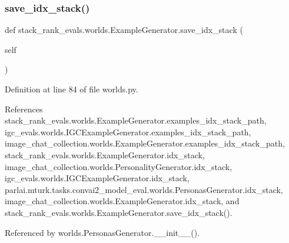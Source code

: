 \subsubsection{\texorpdfstring{save\+\_\+idx\+\_\+stack()}{save\_idx\_stack()}\hspace{0.1cm}{\footnotesize\ttfamily [2/2]}}
{\footnotesize\ttfamily def stack\+\_\+rank\+\_\+evals.\+worlds.\+Example\+Generator.\+save\+\_\+idx\+\_\+stack (\begin{DoxyParamCaption}\item[{}]{self }\end{DoxyParamCaption})}



Definition at line 84 of file worlds.\+py.



References stack\+\_\+rank\+\_\+evals.\+worlds.\+Example\+Generator.\+examples\+\_\+idx\+\_\+stack\+\_\+path, igc\+\_\+evals.\+worlds.\+I\+G\+C\+Example\+Generator.\+examples\+\_\+idx\+\_\+stack\+\_\+path, image\+\_\+chat\+\_\+collection.\+worlds.\+Example\+Generator.\+examples\+\_\+idx\+\_\+stack\+\_\+path, stack\+\_\+rank\+\_\+evals.\+worlds.\+Example\+Generator.\+idx\+\_\+stack, image\+\_\+chat\+\_\+collection.\+worlds.\+Personality\+Generator.\+idx\+\_\+stack, igc\+\_\+evals.\+worlds.\+I\+G\+C\+Example\+Generator.\+idx\+\_\+stack, parlai.\+mturk.\+tasks.\+convai2\+\_\+model\+\_\+eval.\+worlds.\+Personas\+Generator.\+idx\+\_\+stack, image\+\_\+chat\+\_\+collection.\+worlds.\+Example\+Generator.\+idx\+\_\+stack, and stack\+\_\+rank\+\_\+evals.\+worlds.\+Example\+Generator.\+save\+\_\+idx\+\_\+stack().



Referenced by worlds.\+Personas\+Generator.\+\_\+\+\_\+init\+\_\+\+\_\+().

